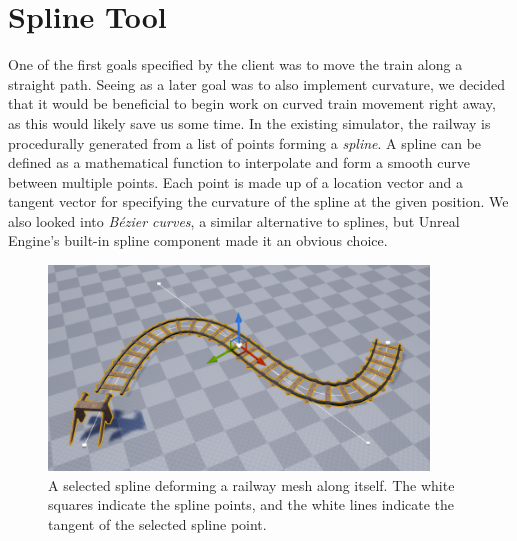 \section{Spline Tool}

One of the first goals specified by the client was to move the train along a straight path. Seeing as a later goal was to also implement curvature, we decided that it would be beneficial to begin work on curved train movement right away, as this would likely save us some time. In the existing simulator, the railway is procedurally generated from a list of points forming a \textit{spline}. A spline can be defined as a mathematical function to interpolate and form a smooth curve between multiple points. Each point is made up of a location vector and a tangent vector for specifying the curvature of the spline at the given position. We also looked into \textit{Bézier curves}, a similar alternative to splines, but Unreal Engine's built-in spline component made it an obvious choice. \newline

\begin{figure}[h]
    \centerline{\includegraphics[width=0.9\textwidth]{figures/Spline1.png}}
    \caption{A selected spline deforming a railway mesh along itself. The white squares indicate the spline points, and the white lines indicate the tangent of the selected spline point.}
    \label{SplineFigure}
\end{figure} 


